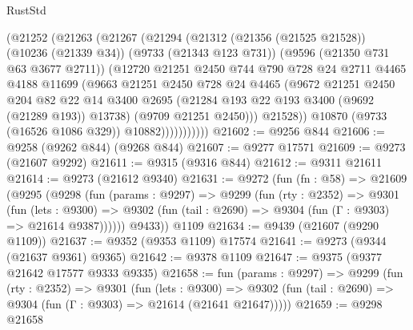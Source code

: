 \begin{lexlean}{RustStd}
\begin{coremodule}
{\begin{coremodule}
{{{{{{{{{{{{{{{{{{{{{{{{{{{{{{{{{{{{{{{{{{{{{{{{{{{{{{{                  (@21252
                    (@21263
                      (@21267
                        (@21294
                          (@21312
                            (@21356 (@21525 @21528))
                            (@10236 (@21339 @34))
                            (@9733 (@21343 @123 @731))
                            (@9596 (@21350 @731 @63 @3677 @2711))
                            (@12720
                              @21251
                              @2450
                              @744
                              @790
                              @728
                              @24
                              @2711
                              @4465
                              @4188
                              @11699
                              (@9663
                                @21251
                                @2450
                                @728
                                @24
                                @4465
                                (@9672
                                  @21251
                                  @2450
                                  @204
                                  @82
                                  @22
                                  @14
                                  @3400
                                  @2695
                                  (@21284 @193 @22 @193 @3400 (@9692 (@21289 @193)) @13738)
                                  (@9709 @21251 @2450)))
                              @21528))
                          @10870
                          (@9733 (@16526 @1086 @329))
                          @10882)))))))))))
@21602 := @9256 @844
@21606 := @9258 (@9262 @844) (@9268 @844)
@21607 := @9277 @17571
@21609 := @9273 (@21607 @9292)
@21611 := @9315 (@9316 @844)
@21612 := @9311 @21611
@21614 := @9273 (@21612 @9340)
@21631 := @9272
    (fun (fn : @58) =>
    @21609
      (@9295
        (@9298
          (fun (params : @9297) =>
          @9299
            (fun (rty : @2352) =>
            @9301
              (fun (lets : @9300) =>
              @9302 (fun (tail : @2690) => @9304 (fun (Γ : @9303) => @21614 @9387))))))
        @9433))
    @1109
@21634 := @9439 (@21607 (@9290 @1109))
@21637 := @9352 (@9353 @1109) @17574
@21641 := @9273 (@9344 (@21637 @9361) @9365)
@21642 := @9378 @1109
@21647 := @9375 (@9377 @21642 @17577 @9333 @9335)
@21658 := fun (params : @9297) =>
  @9299
    (fun (rty : @2352) =>
    @9301
      (fun (lets : @9300) =>
      @9302 (fun (tail : @2690) => @9304 (fun (Γ : @9303) => @21614 (@21641 @21647)))))
@21659 := @9298 @21658
}}}}}}}}}}}}}}}}}}}}}}}}}}}}}}}}}}}}}}}}}}}}}}}}}}}}}}}
\end{coremodule}}
\end{coremodule}
\end{lexlean}
